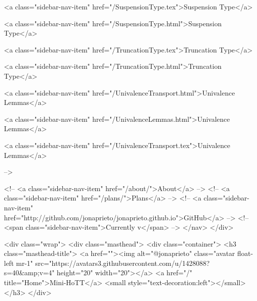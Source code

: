       
    
      
        
          <a class="sidebar-nav-item" href="/SuspensionType.tex">Suspension Type</a>
        
      
    
      
        
          <a class="sidebar-nav-item" href="/SuspensionType.html">Suspension Type</a>
        
      
    
      
        
          <a class="sidebar-nav-item" href="/TruncationType.tex">Truncation Type</a>
        
      
    
      
        
          <a class="sidebar-nav-item" href="/TruncationType.html">Truncation Type</a>
        
      
    
      
        
          <a class="sidebar-nav-item" href="/UnivalenceTransport.html">Univalence Lemmas</a>
        
      
    
      
        
          <a class="sidebar-nav-item" href="/UnivalenceLemmas.html">Univalence Lemmas</a>
        
      
    
      
        
          <a class="sidebar-nav-item" href="/UnivalenceTransport.tex">Univalence Lemmas</a>
        
      
     -->

    <!-- <a class="sidebar-nav-item" href="/about/">About</a> -->
    <!-- <a class="sidebar-nav-item" href="/plans/">Plans</a> -->
    <!-- <a class="sidebar-nav-item" href="http://github.com/jonaprieto/jonaprieto.github.io">GitHub</a> -->
    <!-- <span class="sidebar-nav-item">Currently v</span> -->
  </nav>
</div>

    <div class="wrap">
      <div class="masthead">
        <div class="container">
          <h3 class="masthead-title">
            <a href=""><img alt="@jonaprieto" class="avatar float-left mr-1" src="https://avatars3.githubusercontent.com/u/1428088?s=40&amp;v=4" height="20" width="20"></a>
            <a href="/" title="Home">Mini-HoTT</a>
            <small style="text-decoration:left"></small>
          </h3>
        </div>
      
